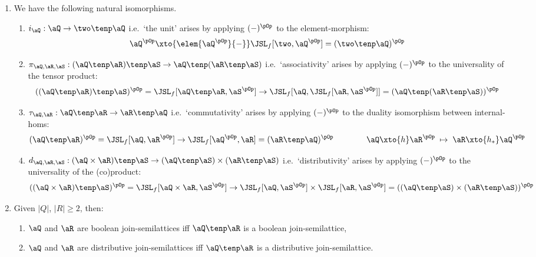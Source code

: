 \documentclass{article}
\begin{document}
\begin{lemma}
\label{lem:tenp_more_basic}
\item
\begin{enumerate}
\item
We have the following natural isomorphisms.
\begin{enumerate}
\item
$i_\aQ :\aQ \to \two \tenp \aQ$ i.e.\ `the unit' arises by applying $(-)^\pOp$ to the element-morphism:
\[
\aQ^{\pOp} \xto{\elem{\aQ^{\pOp}}{-}} \JSL_f[\two,\aQ^{\pOp}] = (\two \tenp \aQ)^{\pOp}
\]

\item
$\pi_{\aQ,\aR,\aS} : (\aQ \tenp \aR) \tenp \aS \to \aQ \tenp (\aR \tenp \aS)$  i.e.\ `associativity' arises by  applying $(-)^{\pOp}$ to the universality of the tensor product:
\[
((\aQ \tenp \aR) \tenp \aS)^{\pOp}
= \JSL_f[\aQ \tenp \aR,\aS^{\pOp}]
\to
\JSL_f[\aQ,\JSL_f[\aR,\aS^{\pOp}]]
= (\aQ \tenp (\aR \tenp \aS))^{\pOp}
\]

\item
$\tau_{\aQ,\aR} : \aQ \tenp \aR \to \aR \tenp \aQ$ i.e.\ `commutativity' arises by applying $(-)^{\pOp}$ to the duality isomorphism between  internal-homs:
\[
(\aQ \tenp \aR)^{\pOp} =  \JSL_f[\aQ,\aR^{\pOp}] \to \JSL_f[\aQ^{\pOp},\aR] = (\aR \tenp \aQ)^{\pOp}
\qquad\qquad
\aQ \xto{h} \aR^{\pOp} \; \mapsto \; \aR \xto{h_*} \aQ^{\pOp}
\]

\item
$d_{\aQ,\aR,\aS} : (\aQ \times \aR) \tenp \aS \to (\aQ \tenp \aS) \times (\aR \tenp \aS)$ i.e.\ `distributivity' arises by applying  $(-)^{\pOp}$ to the universality of the (co)product:
\[
((\aQ \times \aR) \tenp \aS)^{\pOp}
= \JSL_f[\aQ \times \aR,\aS^{\pOp}]
\to \JSL_f[\aQ,\aS^{\pOp}] \times \JSL_f[\aR,\aS^{\pOp}]
= ((\aQ \tenp \aS) \times (\aR \tenp \aS))^{\pOp}
\]
\end{enumerate}

\item
Given $|Q|$, $|R| \geq 2$, then:
\begin{enumerate}
\item
 $\aQ$ and $\aR$ are boolean join-semilattices iff $\aQ \tenp \aR$ is a boolean join-semilattice,
\item
$\aQ$ and $\aR$ are distributive join-semilattices iff $\aQ \tenp \aR$ is a distributive join-semilattice.
\end{enumerate}
\end{enumerate}
\end{lemma}
\end{document}
